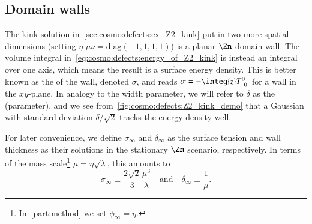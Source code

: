 \subsection{Domain walls}\label{sec:cosmo:defects:dws}
    The kink solution in~\cref{sec:cosmo:defects:ex_Z2_kink} put in two more spatial dimensions (setting $\eta\_{\mu\nu}=\text{diag}(-1,1,1,1)$) is a planar $\Zn$ domain wall. 
    The volume integral in~\cref{eq:cosmo:defects:energy_of_Z2_kink} is instead an integral over one axis, which means the result is a surface energy density. This is better known as the  of the wall, denoted $\sigma$, and reads $\sigma = -\integ{z} T\indices{^0_0}$ for a wall in the $xy$-plane. %
    In analogy to the width parameter, we will refer to $\delta$ as the  (parameter), and we see from~\cref{fig:cosmo:defects:Z2_kink_demo} that a Gaussian with standard deviation $\delta/\sqrt{2}$ tracks the energy density well.
    
    For later convenience, we define $\sigma_\infty$ and $\delta_\infty$ as the surface tension and wall thickness as their solutions in the stationary $\Zn$ scenario, respectively. In terms of the mass scale\footnote{In~\cref{part:method} we set $\phi_\infty = \eta$.} $\mu=\eta\sqrt{\lambda}$, this amounts to
    \begin{equation}\label{eq:cosmo:defects:sigma_delta_inf}
        \sigma_\infty \equiv \frac{2\sqrt{2 }}{3} \frac{\mu^3}{\lambda} \quad\text{and}\quad \delta_\infty \equiv \frac{1}{\mu}.
    \end{equation}
    

